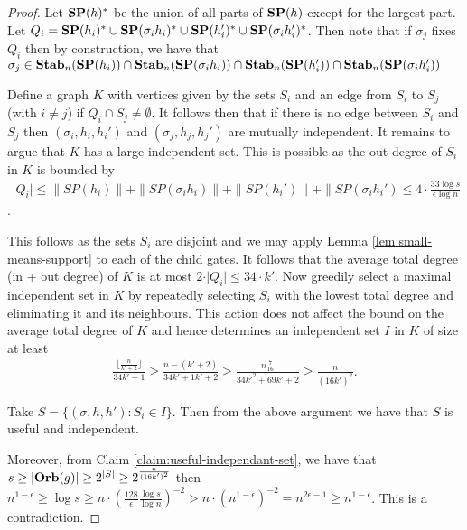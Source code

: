 \documentclass[12pt]{report}
\newcommand{\stab}{\text{\textbf{Stab}}}
\newcommand{\orb}{\text{\textbf{Orb}}}
\newcommand{\SP}{\text{\textbf{SP}}}
\begin{document}
\begin{proof}
  Let $\SP (h)^*$ be the union of all parts of $\SP(h)$ except for the largest
  part. Let $Q_i = \SP(h_i)^* \cup \SP(\sigma_i h_i)^* \cup \SP (h_i')^* \cup
  \SP (\sigma_i h_i')^*$. Then note that if $\sigma_j$ fixes $Q_i$ then by
  construction, we have that $\sigma_j \in \stab_n(\SP(h_i)) \cap
  \stab_n(\SP(\sigma_i h_i)) \cap \stab_n(\SP(h_i')) \cap \stab_n(\SP(\sigma_i
  h_i'))$

  Define a graph $K$ with vertices given by the sets $S_i$ and an edge from
  $S_i$ to $S_j$ (with $i \neq j$) if $Q_i \cap S_j \neq \emptyset$. It follows
  then that if there is no edge between $S_i$ and $S_j$ then $(\sigma_i, h_i,
  h_i')$ and $(\sigma_j, h_j, h_j')$ are mutually independent. It remains to
  argue that $K$ has a large independent set. This is possible as the out-degree
  of $S_i$ in $K$ is bounded by
  \begin{align*}
    \vert Q_i \vert \leq \|SP(h_i) \| + \|SP(\sigma_i h_i) \| + \|SP(h_i') \| + \|SP(\sigma_i h_i') \leq 4 \cdot \frac{33\log s}{\epsilon \log n}
  \end{align*}. 

  This follows as the sets $S_i$ are disjoint and we may apply Lemma
  \ref{lem:small-means-support} to each of the child gates. It follows that the
  average total degree (in + out degree) of $K$ is at most $2 \cdot \vert Q_i
  \vert \leq 34 \cdot k'$. Now greedily select a maximal independent set in $K$
  by repeatedly selecting $S_i$ with the lowest total degree and eliminating it
  and its neighbours. This action does not affect the bound on the average total
  degree of $K$ and hence determines an independent set $I$ in $K$ of size at
  least
  \begin{align*}
    \frac{\lfloor \frac{n}{k' + 2} \rfloor}{34k' + 1} \geq \frac{n - (k'+2)}{34k'+1k'+2} \geq \frac{n\frac{7}{16}}{34k'^2 + 69k' +2} \geq \frac{n}{(16k')^2}.
  \end{align*}

  Take $S = \{(\sigma, h, h') : S_i \in I \}$. Then from the above argument we
  have that $S$ is useful and independent.
  
  Moreover, from Claim \ref{claim:useful-independant-set}, we have that $s \geq
  \vert \orb(g) \vert \geq 2^{\vert S \vert} \geq 2^{\frac{n}{(16k')^2}}$ then
  $n^{1-\epsilon} \geq \log s \geq n \cdot (\frac{128}{\epsilon}\frac{\log
    s}{\log n})^{-2} > n \cdot (n^{1-\epsilon})^{-2} = n^{2\epsilon -1} \geq
  n^{1-\epsilon}$. This is a contradiction.
\end{proof}
\end{document}
